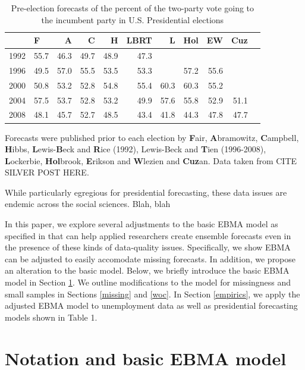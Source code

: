 \documentclass[12pt,fullpage,endnotes]{article}
\begin{document}
\begin{table}[ht]
\caption{Pre-election forecasts of the percent of the two-party vote going to the incumbent party in U.S. Presidential elections}
\footnotesize
\begin{center}
\begin{tabular}{rlrrrrrrrrr}
  \toprule
  & F & A & C & H & LBRT & L & Hol & EW & Cuz \\ 
  \midrule
  1992 & 55.7 & 46.3 & 49.7 & 48.9 & 47.3 &  &  &  &  \\ 
  1996 & 49.5 & 57.0 & 55.5 & 53.5 & 53.3 &  & 57.2 & 55.6 &  \\ 
  2000 & 50.8 & 53.2 & 52.8 & 54.8 & 55.4 & 60.3 & 60.3 & 55.2 &  \\ 
  2004 & 57.5 & 53.7 & 52.8 & 53.2 & 49.9 & 57.6 & 55.8 & 52.9 & 51.1 \\ 
  2008 & 48.1 & 45.7 & 52.7 & 48.5 & 43.4 & 41.8 & 44.3 & 47.8 & 47.7 \\ 
  \bottomrule

\end{tabular}
\end{center}
Forecasts were published prior to each election by \textbf{F}air, \textbf{A}bramowitz, \textbf{C}ampbell, \textbf{H}ibbs, \textbf{L}ewis-\textbf{B}eck and \textbf{R}ice (1992), Lewis-Beck and \textbf{T}ien  (1996-2008),   \textbf{L}ockerbie, \textbf{Hol}brook, \textbf{E}rikson and \textbf{W}lezien and \textbf{Cuz}an.  Data taken from CITE SILVER POST HERE.
\end{table}

While particularly egregious for presidential forecasting, these data
issues are endemic across the social sciences.  Blah, blah

In this paper, we explore several adjustments to the basic EBMA model
as specified in \citet{Montgomery:2012} that can help applied
researchers create ensemble forecasts even in the presence of these
kinds of data-quality issues.  Specifically, we show EBMA can be
adjusted to easily accomodate missing forecasts.  In addition, we
propose an alteration to the basic model.  Below, we briefly introduce
the basic EBMA model in Section \ref{model}.  We outline modifications
to the model for missingness and small samples in Sections
\ref{missing} and \ref{woc}. In Section \ref{empirics}, we apply the
adjusted EBMA model to unemployment data as well as presidential
forecasting models shown in Table 1.


\section{Notation and basic EBMA model} 
\label{model}
\end{document}
